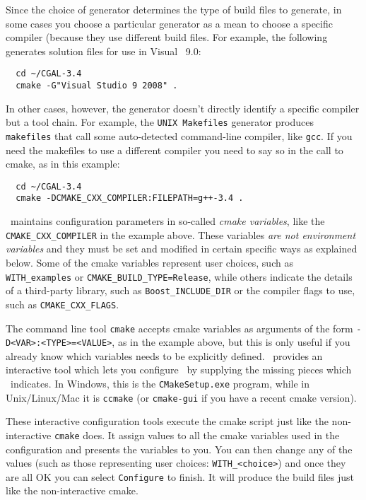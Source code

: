 Since the choice of generator determines the type of build files to generate, in some cases
you choose a particular generator as a mean to choose a specific compiler (because they use different 
build files. For example, the following generates solution files for use in Visual \CC\ 9.0:

{\ccTexHtml{\scriptsize}{}
\begin{verbatim}
  cd ~/CGAL-3.4
  cmake -G"Visual Studio 9 2008" . 
\end{verbatim}
}

In other cases, however, the generator doesn't directly identify a specific compiler but a tool chain.
For example, the \texttt{UNIX Makefiles} generator produces \texttt{makefiles} that call some auto-detected
command-line compiler, like \texttt{gcc}. If you need the makefiles to use a different compiler you need to
say so in the call to cmake, as in this example:

{\ccTexHtml{\scriptsize}{}
\begin{verbatim}
  cd ~/CGAL-3.4
  cmake -DCMAKE_CXX_COMPILER:FILEPATH=g++-3.4 . 
\end{verbatim}
}


\cmake\ maintains configuration parameters in so-called {\em cmake variables}, like the \texttt{CMAKE\_CXX\_COMPILER}
in the example above. These variables {\em are not environment variables} and they must be set and modified in
certain specific ways as explained below. Some of the cmake variables represent user choices, such as
\texttt{WITH\_examples} or \texttt{CMAKE\_BUILD\_TYPE=Release}, while others indicate the details of a third-party library, 
such as \texttt{Boost\_INCLUDE\_DIR} or the compiler flags to use, such as \texttt{CMAKE\_CXX\_FLAGS}. 

The command line tool \texttt{cmake} accepts cmake variables as arguments of the form \texttt{-D<VAR>:<TYPE>=<VALUE>}, as
in the example above, but this is only useful if you already know which variables needs to be explicitly defined.
\cmake\ provides an interactive tool which lets you configure \cgal\ by supplying the missing pieces 
which \cmake\ indicates. In Windows, this is the \texttt{CMakeSetup.exe} program, while in Unix/Linux/Mac it is \texttt{ccmake}
(or \texttt{cmake-gui} if you have a recent cmake version). 

These interactive configuration tools execute the cmake script just like the non-interactive \texttt{cmake} does. It assign
values to all the cmake variables used in the configuration and presents the variables to you. You can then change 
any of the values (such as those representing user choices: \texttt{WITH\_<choice>}) and once they are all OK you can select 
\texttt{Configure} to finish. It will produce the build files just like the non-interactive cmake.


